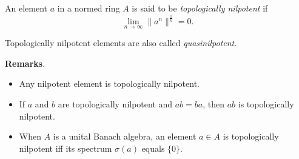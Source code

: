 \documentclass[12pt]{article}
\begin{document}
An element $a$ in a normed ring $A$ is said to be \emph{topologically nilpotent} if $$\lim_{n\to\infty} \|a^n\|^{\frac{1}{n}}=0.$$

Topologically nilpotent elements are also called \emph{quasinilpotent}.

\textbf{Remarks}. 
\begin{itemize}
\item Any nilpotent element is topologically nilpotent.
\item If $a$ and $b$ are topologically nilpotent and $ab=ba$, then $ab$ is topologically nilpotent.
\item When $A$ is a unital Banach algebra, an element $a \in A$ is topologically nilpotent iff its spectrum $\sigma(a)$ equals $\{0\}$.
\end{itemize}
\end{document}
